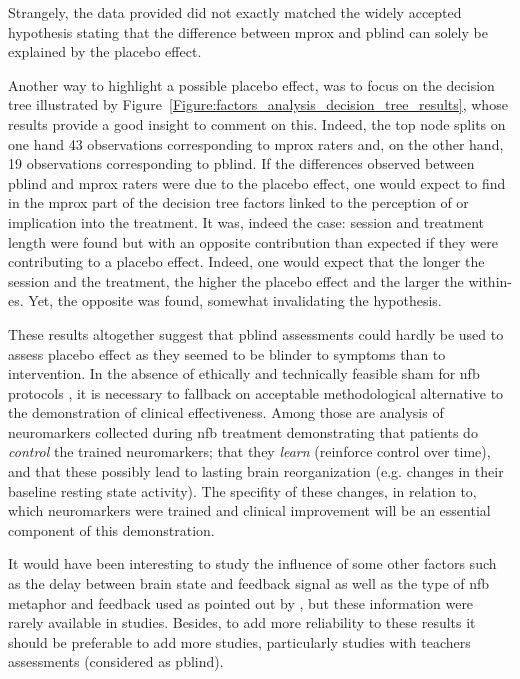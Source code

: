 Strangely, the data provided did not exactly matched the widely accepted hypothesis stating that the difference between
\gls{mprox} and \gls{pblind} can solely be explained by the placebo effect. 

Another way to highlight a possible placebo effect, was to focus on the decision tree illustrated by 
Figure~\ref{Figure:factors_analysis_decision_tree_results}, whose results provide a good insight to comment on this.
Indeed, the top node splits on one hand 43 observations corresponding to \gls{mprox} raters and, on the other hand, 
19 observations corresponding to \gls{pblind}. If the differences observed between \gls{pblind} and \gls{mprox} raters were 
due to the placebo effect, one would expect to find in the \gls{mprox} part of the decision tree factors linked to the perception
of or implication into the treatment. It was, indeed the case: session and treatment length were found but with an
opposite contribution than expected if they were contributing to a placebo effect.  Indeed, one would expect that the
longer the session and the treatment, the higher the placebo effect and the larger the within-\gls{es}. Yet, the opposite was found, 
somewhat invalidating the hypothesis. 

These results altogether suggest that \gls{pblind} assessments could hardly be used to assess placebo effect as they seemed to be blinder 
to symptoms than to intervention. In the absence of ethically \citep{Holtmann2014} and technically \citep{Birbaumer1991} feasible sham 
for \gls{nfb} protocols \citep{World-Medical-Association2000}, it is necessary to fallback on acceptable methodological alternative to 
the demonstration of clinical effectiveness. Among those are analysis of neuromarkers collected during \gls{nfb} treatment demonstrating 
that patients do \emph{control} the trained neuromarkers; that they \emph{learn} (reinforce control over time), and that these possibly 
lead to lasting brain reorganization (e.g. changes in their baseline resting state activity). The specifity of these changes, in relation 
to, which neuromarkers were trained and clinical improvement will be an essential component of this demonstration.  

It would have been interesting to study the influence of some other factors such as the delay between brain state and feedback signal 
as well as the type of \gls{nfb} metaphor and feedback used as pointed out by \citet{Alkoby2017}, but these information were rarely 
available in studies. Besides, to add more reliability to these results it should be preferable to add more studies, particularly studies 
with teachers assessments (considered as \gls{pblind}). 





